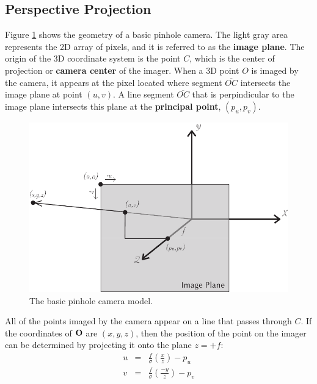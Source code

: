 \subsection{Perspective Projection}

Figure \ref{fig:pinhole} shows the geometry of a basic pinhole camera.
The light gray area represents the 2D array of pixels, and it is
referred to as the {\bf image plane}.  The origin of the 3D coordinate
system is the point $C$, which is the center of projection or {\bf
  camera center} of the imager.  When a 3D point $O$ is imaged by the
camera, it appears at the pixel located where segment $\overline{OC}$
intersects the image plane at point $(u,v)$.  A line segment
$\overline{OC}$ that is perpindicular to the image plane intersects
this plane at the {\bf principal point}, $(p_u, p_v)$.

\begin{figure}[tbp]
\begin{center}
  \includegraphics[width=5in]{images/camera_module_pinhole.pdf}
 \end{center}
  \label{fig:pinhole}
  \caption{The basic pinhole camera model.}
\end{figure}

All of the points imaged by the camera appear on a line that passes
through $C$.  If the coordinates of ${\bf O}$ are $(x,y,z)$, then the
position of the point on the imager can be determined by projecting it
onto the plane $ z = +f$:
\begin{eqnarray}
\label{eqn:forward-projection-1}
u &=& \frac{f}{\sigma} \left(\frac{x}{z}\right) - p_u \\
\label{eqn:forward-projection-2}
v &=& \frac{f}{\sigma} \left(\frac{-y}{z}\right) - p_v
\end{eqnarray}

